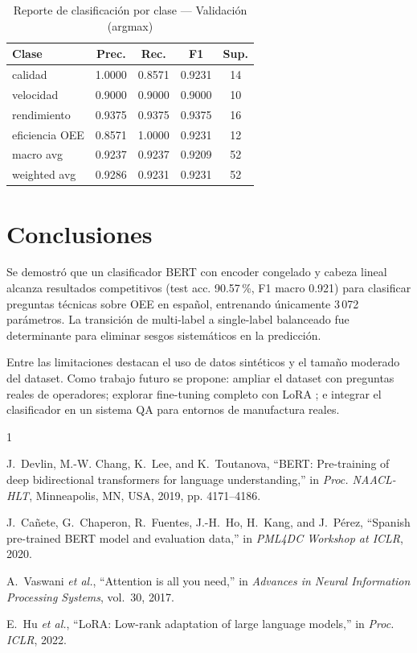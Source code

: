 \documentclass[conference]{IEEEtran}
\begin{document}
\begin{table}[h]
\centering
\caption{Reporte de clasificación por clase — Validación (argmax)}
\label{tab:report}
\begin{tabular}{lcccc}
\toprule
\textbf{Clase} & \textbf{Prec.} & \textbf{Rec.} & \textbf{F1} & \textbf{Sup.} \\
\midrule
calidad        & 1.0000 & 0.8571 & 0.9231 & 14 \\
velocidad      & 0.9000 & 0.9000 & 0.9000 & 10 \\
rendimiento    & 0.9375 & 0.9375 & 0.9375 & 16 \\
eficiencia OEE & 0.8571 & 1.0000 & 0.9231 & 12 \\
\midrule
macro avg      & 0.9237 & 0.9237 & 0.9209 & 52 \\
weighted avg   & 0.9286 & 0.9231 & 0.9231 & 52 \\
\bottomrule
\end{tabular}
\end{table}

\section{Conclusiones}

Se demostró que un clasificador BERT con encoder congelado y cabeza lineal
alcanza resultados competitivos (test acc. 90.57\,\%, F1 macro 0.921) para
clasificar preguntas técnicas sobre OEE en español, entrenando únicamente
3\,072 parámetros. La transición de multi-label a single-label balanceado
fue determinante para eliminar sesgos sistemáticos en la predicción.

Entre las limitaciones destacan el uso de datos sintéticos y el tamaño
moderado del dataset. Como trabajo futuro se propone: ampliar el dataset con
preguntas reales de operadores; explorar fine-tuning completo con LoRA
\cite{hu2022lora}; e integrar el clasificador en un sistema QA para
entornos de manufactura reales.

\begin{thebibliography}{1}

J.~Devlin, M.-W. Chang, K.~Lee, and K.~Toutanova,
``BERT: Pre-training of deep bidirectional transformers for language understanding,''
in \textit{Proc. NAACL-HLT}, Minneapolis, MN, USA, 2019, pp. 4171--4186.

J.~Cañete, G.~Chaperon, R.~Fuentes, J.-H.~Ho, H.~Kang, and J.~Pérez,
``Spanish pre-trained BERT model and evaluation data,''
in \textit{PML4DC Workshop at ICLR}, 2020.

A.~Vaswani \textit{et al.},
``Attention is all you need,''
in \textit{Advances in Neural Information Processing Systems}, vol.~30, 2017.

E.~Hu \textit{et al.},
``LoRA: Low-rank adaptation of large language models,''
in \textit{Proc. ICLR}, 2022.

\end{thebibliography}
\end{document}
